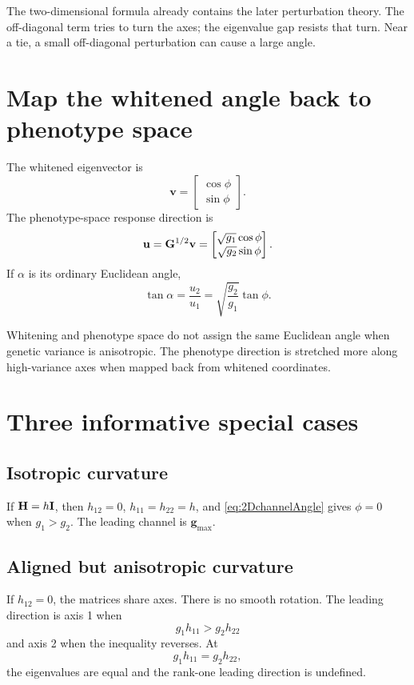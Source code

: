 \begin{geombox}
The two-dimensional formula already contains the later perturbation theory. The off-diagonal term tries to turn the axes; the eigenvalue gap resists that turn. Near a tie, a small off-diagonal perturbation can cause a large angle.
\end{geombox}

\section{Map the whitened angle back to phenotype space}

The whitened eigenvector is
\begin{equation}
\mathbf v=
\begin{bmatrix}\cos\phi\\\sin\phi\end{bmatrix}.
\end{equation}
The phenotype-space response direction is
\begin{equation}
\mathbf u=\mathbf{G}^{1/2}\mathbf v
=
\begin{bmatrix}
\sqrt{g_1}\cos\phi\\
\sqrt{g_2}\sin\phi
\end{bmatrix}.
\end{equation}
If \(\alpha\) is its ordinary Euclidean angle,
\begin{equation}
\tan\alpha
=\frac{u_2}{u_1}
=\sqrt{\frac{g_2}{g_1}}\tan\phi.
\label{eq:phenotypeAngle2D}
\end{equation}

\inwords Whitening and phenotype space do not assign the same Euclidean angle when genetic variance is anisotropic. The phenotype direction is stretched more along high-variance axes when mapped back from whitened coordinates.

\section{Three informative special cases}

\subsection{Isotropic curvature}
If \(\mathbf{H}=h\mathbf{I}\), then \(h_{12}=0\), \(h_{11}=h_{22}=h\), and \cref{eq:2DchannelAngle} gives \(\phi=0\) when \(g_1>g_2\). The leading channel is \(\mathbf g_{\max}\).

\subsection{Aligned but anisotropic curvature}
If \(h_{12}=0\), the matrices share axes. There is no smooth rotation. The leading direction is axis 1 when
\begin{equation}
g_1h_{11}>g_2h_{22}
\end{equation}
and axis 2 when the inequality reverses. At
\begin{equation}
g_1h_{11}=g_2h_{22},
\end{equation}
the eigenvalues are equal and the rank-one leading direction is undefined.

